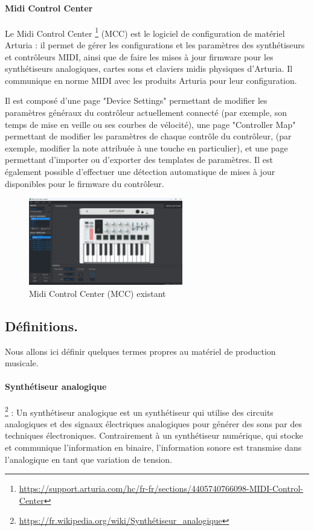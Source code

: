 \documentclass[francais]{rapportPFE}  %
\begin{document}
\paragraph{Midi Control Center}
Le Midi Control Center
\footnote{\url{https://support.arturia.com/hc/fr-fr/sections/4405740766098-MIDI-Control-Center}}
 (MCC) est le logiciel de configuration de matériel Arturia : il
permet de gérer les configurations et les paramètres des synthétiseurs et contrôleurs MIDI, ainsi que de faire les mises à jour firmware pour les synthétiseurs analogiques, cartes sons et claviers midis physiques d’Arturia. Il communique en norme MIDI avec les produits Arturia pour leur configuration.

Il est composé d'une page "Device Settings" permettant de modifier les paramètres généraux du contrôleur actuellement connecté (par exemple, son temps de mise en veille ou ses courbes de vélocité), une page "Controller Map" permettant de modifier les paramètres de chaque contrôle du contrôleur, (par exemple, modifier la note attribuée à une touche en particulier), et une page permettant d'importer ou d'exporter des templates de paramètres. Il est également possible d'effectuer une détection automatique de mises à jour disponibles pour le firmware du contrôleur.

\begin{figure}[!t]
	\centering
	\includegraphics[width=0.6\textwidth]{graphics/mcc_existant.png}
	\begin{tiny}
	\end{tiny}
	\caption{Midi Control Center (MCC) existant}
	\label{fig:Expe}
\end{figure}


\subsection{Définitions.}
Nous allons ici définir quelques termes propres au matériel de production musicale.
\paragraph{Synthétiseur analogique} \footnote{\url{https://fr.wikipedia.org/wiki/Synthétiseur_analogique}} 
:
 Un synthétiseur analogique est un synthétiseur qui utilise des circuits analogiques et des signaux électriques analogiques pour générer des sons par des techniques électroniques. Contrairement à un synthétiseur numérique, qui stocke et communique l'information en binaire, l'information sonore est transmise dans l'analogique en tant que variation de tension.
\end{document}

